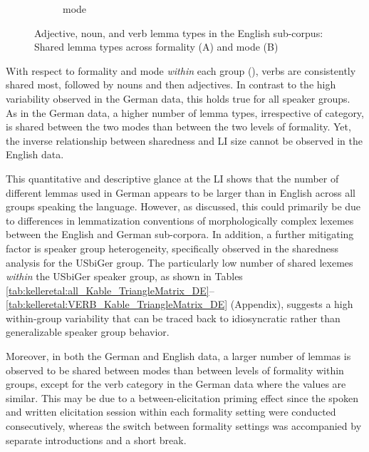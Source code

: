 \documentclass[output=paper,colorlinks,citecolor=brown]{langscibook}
\begin{document}
\begin{figure}[hp]
\begin{subfigure}{\textwidth}
    \caption{mode}
    \end{subfigure}
    \caption{Adjective, noun, and verb lemma types in the English sub-corpus: Shared lemma types across formality (A) and mode (B)}
    \label{fig:kelleretal:arrangedformalityEN}
\end{figure}

With respect to formality and mode \textit{within} each group (), verbs are consistently shared most, followed by nouns and then adjectives. In contrast to the high variability observed in the German data, this holds true for all speaker groups. As in the German data, a higher number of lemma types, irrespective of category, is shared between the two modes than between the two levels of formality. Yet, the inverse relationship between sharedness and LI size cannot be observed in the English data.

This quantitative and descriptive glance at the LI shows that the number of different lemmas used in German appears to be larger than in English across all groups speaking the language. However, as discussed, this could primarily be due to differences in lemmatization conventions of morphologically complex lexemes between the English and German sub-corpora. In addition, a further mitigating factor is speaker group heterogeneity, specifically observed in the sharedness analysis for the USbiGer group. The particularly low number of shared lexemes \textit{within} the USbiGer speaker group, as shown in Tables \ref{tab:kelleretal:all_Kable_TriangleMatrix_DE}--\ref{tab:kelleretal:VERB_Kable_TriangleMatrix_DE} (Appendix), suggests a high within-group variability that can be traced back to idiosyncratic rather than generalizable speaker group behavior.

Moreover, in both the German and English data, a larger number of lemmas is observed to be shared between modes than between levels of formality within groups, except for the verb category in the German data where the values are similar. This may be due to a between-elicitation priming effect since the spoken and written elicitation session within each formality setting were conducted consecutively, whereas the switch between formality settings was accompanied by separate introductions and a short break. 
\end{document}
